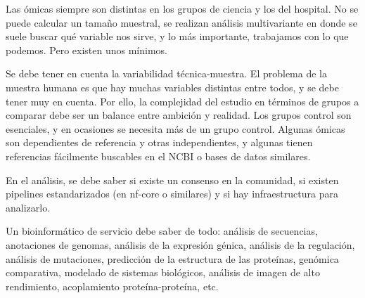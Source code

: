 Las ómicas siempre son distintas en los grupos de ciencia y los del hospital. No se puede calcular un tamaño muestral, se realizan análisis multivariante en donde se suele buscar qué variable nos sirve, y lo más importante, trabajamos con lo que podemos. Pero existen unos mínimos. 

Se debe tener en cuenta la variabilidad técnica-muestra. El problema de la muestra humana es que hay muchas variables distintas entre todos, y se debe tener muy en cuenta. Por ello, la complejidad del estudio en términos de grupos a comparar debe ser un balance entre ambición y realidad. Los grupos control son esenciales, y en ocasiones se necesita más de un grupo control. Algunas ómicas son dependientes de referencia y otras independientes, y algunas tienen referencias fácilmente buscables en el NCBI o bases de datos similares. 

En el análisis, se debe saber si existe un consenso en la comunidad, si existen pipelines estandarizados (en nf-core o similares) y si hay infraestructura para analizarlo. 

Un bioinformático de servicio debe saber de todo: análisis de secuencias, anotaciones de genomas, análisis de la expresión génica, análisis de la regulación, análisis de mutaciones, predicción de la estructura de las proteínas, genómica comparativa, modelado de sistemas biológicos, análisis de imagen de alto rendimiento, acoplamiento proteína-proteína, etc.

